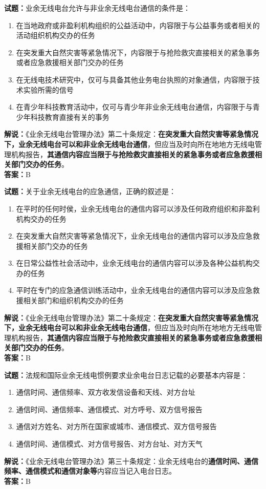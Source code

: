 \documentclass{ctexbook}
\begin{document}
\noindent\textbf{试题：}业余无线电台允许与非业余无线电台通信的条件是：
\begin{enumerate}[leftmargin=3em]
\item 在当地政府或非盈利机构组织的公益活动中，内容限于与公益事务或者相关的活动组织机构交办的任务
\item 在突发重大自然灾害等紧急情况下，内容限于与抢险救灾直接相关的紧急事务或者应急救援相关部门交办的任务
\item 在无线电技术研究中，仅可与具备其他业务电台执照的对象通信，内容限于技术实验所需的信号
\item 在青少年科技教育活动中，仅可与青少年非业余无线电台通信，内容限于与青少年科技教育直接有关的事务
\end{enumerate}
\noindent\textbf{解说：}《业余无线电台管理办法》第二十条规定：\textbf{在突发重大自然灾害等紧急情况下，业余无线电台可以和非业余无线电台通信}，但应当及时向所在地地方无线电管理机构报告，\textbf{其通信内容应当限于与抢险救灾直接相关的紧急事务或者应急救援相关部门交办的任务}。\\\noindent\textbf{答案：}B



\bigskip


\noindent\textbf{试题：}关于业余无线电台的应急通信，正确的叙述是：
\begin{enumerate}[leftmargin=3em]
\item 在平时的任何时侯，业余无线电台的通信内容可以涉及任何政府组织和非盈利机构交办的任务
\item 在突发重大自然灾害等紧急情况下，业余无线电台的通信内容可以涉及应急救援相关部门交办的任务
\item 在日常公益性社会活动中，业余无线电台的通信内容可以涉及各种公益机构交办的任务
\item 平时在专门的应急通信训练活动中，业余无线电台的通信内容可以涉及应急救援相关部门和组织机构交办的任务
\end{enumerate}
\noindent\textbf{解说：}《业余无线电台管理办法》第二十条规定：\textbf{在突发重大自然灾害等紧急情况下，业余无线电台可以和非业余无线电台通信}，但应当及时向所在地地方无线电管理机构报告，\textbf{其通信内容应当限于与抢险救灾直接相关的紧急事务或者应急救援相关部门交办的任务}。\\\noindent\textbf{答案：}B




\bigskip


\noindent\textbf{试题：}法规和国际业余无线电惯例要求业余电台日志记载的必要基本内容是：
\begin{enumerate}[leftmargin=3em]
\item 通信时间、通信频率、双方收发信设备和天线、对方台址
\item 通信时间、通信频率、通信模式、对方呼号、双方信号报告
\item 通信对方姓名、对方所在国家或城市、通信模式、双方信号报告
\item 通信时间、通信模式、对方信号报告、对方台址、对方天气
\end{enumerate}
\noindent\textbf{解说：}《业余无线电台管理办法》第三十条规定：业余无线电台的\textbf{通信时间、通信频率、通信模式和通信对象等}内容应当记入电台日志。\\\noindent\textbf{答案：}B
\end{document}
